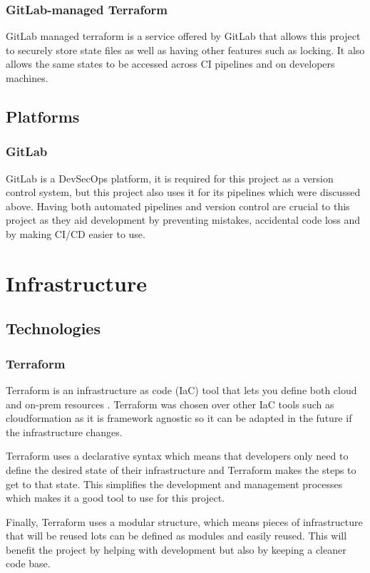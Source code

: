 \documentclass[]{project_report}
\begin{document}
\subsubsection{GitLab-managed Terraform}
GitLab managed terraform is a service offered by GitLab that allows this project to securely store state files as well as having other features such as locking. It also allows the same states to be accessed across CI pipelines and on developers machines. 


\subsection{Platforms}
\subsubsection{GitLab}

GitLab is a DevSecOps platform, it is required for this project as a version control system, but this project also uses it for its pipelines which were discussed above. Having both automated pipelines and version control are crucial to this project as they aid development by preventing mistakes, accidental code loss and by making CI/CD easier to use.


\section{Infrastructure}
\subsection{Technologies}
\subsubsection{Terraform}

Terraform is an infrastructure as code (IaC) tool that lets you define both cloud and on-prem resources \cite{terraform}. Terraform was chosen over other IaC tools such as cloudformation as it is framework agnostic so it can be adapted in the future if the infrastructure changes.

Terraform uses a declarative syntax which means that developers only need to define the desired state of their infrastructure and Terraform makes the steps to get to that state. This simplifies the development and management processes which makes it a good tool to use for this project.

Finally, Terraform uses a modular structure, which means pieces of infrastructure that will be reused lots can be defined as modules and easily reused. This will benefit the project by helping with development but also by keeping a cleaner code base.
\end{document}
